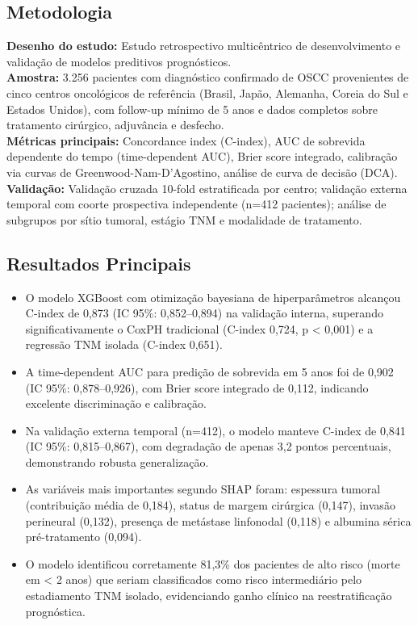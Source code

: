 \subsection{Metodologia}
\textbf{Desenho do estudo:} Estudo retrospectivo multicêntrico de
desenvolvimento e validação de modelos preditivos prognósticos. \\
\textbf{Amostra:} 3.256 pacientes com diagnóstico confirmado de OSCC
provenientes de cinco centros oncológicos de referência (Brasil, Japão,
Alemanha, Coreia do Sul e Estados Unidos), com follow-up mínimo de 5 anos
e dados completos sobre tratamento cirúrgico, adjuvância e desfecho. \\
\textbf{Métricas principais:} Concordance index (C-index), AUC de
sobrevida dependente do tempo (time-dependent AUC), Brier score
integrado, calibração via curvas de Greenwood-Nam-D'Agostino, análise
de curva de decisão (DCA). \\
\textbf{Validação:} Validação cruzada 10-fold estratificada por centro;
validação externa temporal com coorte prospectiva independente (n=412
pacientes); análise de subgrupos por sítio tumoral, estágio TNM e
modalidade de tratamento.

\subsection{Resultados Principais}
\begin{itemize}
  \item O modelo XGBoost com otimização bayesiana de hiperparâmetros
        alcançou C-index de 0,873 (IC 95\%: 0,852--0,894) na validação
        interna, superando significativamente o CoxPH tradicional
        (C-index 0,724, p < 0,001) e a regressão TNM isolada
        (C-index 0,651).
  \item A time-dependent AUC para predição de sobrevida em 5 anos foi
        de 0,902 (IC 95\%: 0,878--0,926), com Brier score integrado
        de 0,112, indicando excelente discriminação e calibração.
  \item Na validação externa temporal (n=412), o modelo manteve C-index
        de 0,841 (IC 95\%: 0,815--0,867), com degradação de apenas
        3,2 pontos percentuais, demonstrando robusta generalização.
  \item As variáveis mais importantes segundo SHAP foram: espessura
        tumoral (contribuição média de 0,184), status de margem
        cirúrgica (0,147), invasão perineural (0,132), presença de
        metástase linfonodal (0,118) e albumina sérica pré-tratamento
        (0,094).
  \item O modelo identificou corretamente 81,3\% dos pacientes de alto
        risco (morte em < 2 anos) que seriam classificados como risco
        intermediário pelo estadiamento TNM isolado, evidenciando ganho
        clínico na reestratificação prognóstica.
\end{itemize}

